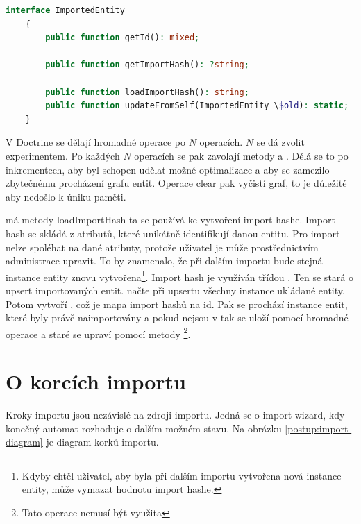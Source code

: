 \begin{lstlisting}[language=PHP, caption={Zdrojový kód \codename{ImportedEntity}}]
    interface ImportedEntity
    {
        public function getId(): mixed;
    
        public function getImportHash(): ?string;   

        public function loadImportHash(): string;   
        public function updateFromSelf(ImportedEntity \$old): static;
    }
\end{lstlisting}

V Doctrine se dělají hromadné operace po $N$ operacích. $N$ se dá zvolit experimentem.
Po každých $N$ operacích se pak zavolají metody  a . Dělá se to po inkrementech, aby  byl schopen udělat možné optimalizace a aby se zamezilo zbytečnému procházení grafu entit. Operace clear pak vyčistí graf, to je důležité aby nedošlo k úniku paměti.

 má metody loadImportHash ta se používá ke vytvoření import hashe. Import hash se skládá z atributů, které unikátně identifikují danou entitu. Pro import nelze spoléhat na dané atributy, protože uživatel je může prostřednictvím administrace upravit. To by znamenalo, že při dalším importu bude stejná instance entity znovu vytvořena\footnote{Kdyby chtěl uživatel, aby byla při dalším importu vytvořena nová instance entity, může vymazat hodnotu import hashe.}.
Import hash je využíván třídou . Ten se stará o upsert importovaných entit.
 načte při upsertu všechny instance ukládané entity.
Potom vytvoří , což je mapa import hashů na id.
Pak se prochází instance entit, které byly právě naimportovány a pokud nejsou v  tak se uloží pomocí hromadné operace a staré  se upraví pomocí metody \footnote{Tato operace nemusí být využita}.


\section{O korcích importu}

Kroky importu jsou nezávislé na zdroji importu. 
Jedná se o import wizard, kdy konečný automat  rozhoduje o dalším možném stavu. 
Na obrázku \ref{postup:import-diagram} je diagram korků importu.

